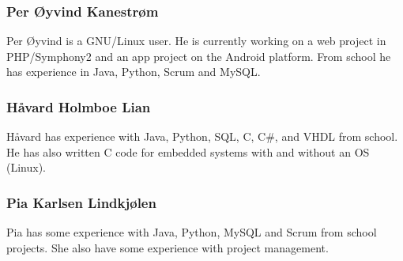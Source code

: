 \subsubsection{Per Øyvind Kanestrøm}
Per Øyvind is a GNU/Linux user. He is currently working on a web project in PHP/Symphony2 and an app project on the Android platform. From school he has experience in Java, Python, Scrum and MySQL.

\subsubsection{Håvard Holmboe Lian}
Håvard has experience with Java, Python, SQL, C, C\#, and VHDL from school. He has also written C code for embedded systems with and without an OS (Linux). 

\subsubsection{Pia	Karlsen	Lindkjølen}
Pia has some experience with Java, Python, MySQL and Scrum from school projects. She also have some experience with project management. 
